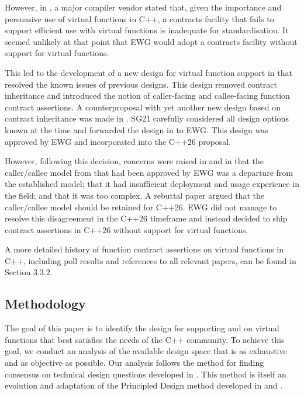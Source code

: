 However, in \cite{P3173R0}, a major compiler vendor stated that, given the importance and persuasive use of virtual functions in C++, a contracts facility that fails to support efficient use with virtual functions is inadequate for standardisation. It seemed unlikely at that point that EWG would adopt a contracts facility without support for virtual functions.

This led to the development of a new design for virtual function support in \cite{P3097R0} that resolved the known issues of previous designs. This design removed contract inheritance and introduced the notion of caller-facing and callee-facing function contract assertions. A counterproposal with yet another new design based on contract inheritance was made in \cite{P3169R0}. SG21 carefully considered all design options known at the time and forwarded the design in \cite{P3097R0} to EWG. This design was approved by EWG and incorporated into the C++26 proposal.

However, following this decision, concerns were raised in \cite{P3506R0} and in \cite{P3573R0} that the caller/callee model from \cite{P3097R0} that had been approved by EWG was a departure from the established model; that it had insufficient deployment and usage experience in the field; and that it was too complex. A rebuttal paper \cite{P3506R0} argued that the caller/callee model should be retained for C++26. EWG did not manage to resolve this disagreement in the C++26 timeframe and instead decided to ship contract assertions in C++26 without support for virtual functions.

A more detailed history of function contract assertions on virtual functions in C++, including poll results and references to all relevant papers, can be found in \cite{P2899R1} Section 3.3.2.

\subsection{Methodology}

The goal of this paper is to identify the design for supporting  and  on virtual functions that best satisfies the needs of the C++ community. To achieve this goal, we conduct an analysis of the available design space that is as exhaustive and as objective as possible. Our analysis follows the method for finding consensus on technical design questions developed in \cite{P3684R0}. This method is itself an evolution and adaptation of the Principled Design method developed in \cite{P3004R0} and \cite{P3005R0}.

